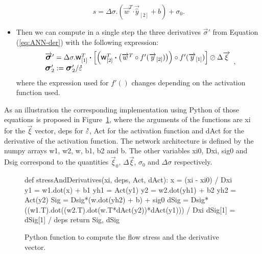 \documentclass[algorithms,article,submit,pdftex,oneauthors]{Definitions/mdpi}
\DeclareRobustCommand{\w}{\mbox{\large\ensuremath{\mathsf{w}}}}
\DeclareRobustCommand{\dotp}{\boldsymbol{\cdot}}
\DeclareRobustCommand{\lay}[1]{_{[#1]}}
\DeclareRobustCommand{\mdot}[1]{\accentset{\mbox{\bfseries .}}{#1}}
\DeclareRobustCommand{\Sig}{\mbox{\large\ensuremath{\boldsymbol{\sigma}}}}
\DeclareRobustCommand{\var}[1]{\textsf{#1}}
\begin{document}
\begin{itemize}
\begin{equation}
s = \Delta\sigma.\left(\overrightarrow{w}^T \dotp \overrightarrow{\hat{y}}\lay{2} + b\right) + \sigma_{0}.
\end{equation}
\item Then we can compute in a single step the three derivatives $\overrightarrow{\sigma}'$ from Equation (\ref{eq:ANN-der}) with the following expression:
\begin{equation}
\begin{array}{l}
\overrightarrow{\Sig}' = \Delta\sigma.\w\lay{1}^T \dotp\left[\left(\w\lay{2}^T \dotp \left(\overrightarrow{w}^T \circ f'(\overrightarrow{y}\lay{2})\right)\right) \circ f'(\overrightarrow{y}\lay{1})\right] \oslash \Delta\overrightarrow{\xi}\\
\Sig_2' := \Sig_2' / \mdot{\varepsilon}
\end{array},
\end{equation}
where the expression used for $f'()$ changes depending on the activation function used.
\end{itemize}
As an illustration the corresponding implementation using Python of those equations is proposed in Figure~\ref{fig:PythonStress}, where the arguments of the functions are \var{xi} for the $\overrightarrow{\xi}$ vector, \var{deps} for $\mdot{\varepsilon}$, \var{Act} for the activation function and \var{dAct} for the derivative of the activation function.
The network architecture is defined by the numpy arrays \var{w1}, \var{w2}, \var{w}, \var{b1}, \var{b2} and \var{b}.
The other variables \var{xi0}, \var{Dxi}, \var{sig0} and \var{Dsig} correspond to the quantities $\overrightarrow{\xi}_{0}$, $\Delta\overrightarrow{\xi}$, $\sigma_{0}$ and $\Delta\sigma$ respectively.
\begin{figure}[h]
\begin{PythonListing}
def stressAndDerivatives(xi, deps, Act, dAct):
  x = (xi - xi0) / Dxi
  y1 = w1.dot(x) + b1
  yh1 = Act(y1)
  y2 = w2.dot(yh1) + b2
  yh2 = Act(y2)
  Sig = Dsig*(w.dot(yh2) + b) + sig0
  dSig = Dsig*((w1.T).dot((w2.T).dot(w.T*dAct(y2))*dAct(y1))) / Dxi
  dSig[1] = dSig[1] / deps
  return Sig, dSig
\end{PythonListing}
\caption{Python function to compute the flow stress and the derivative vector.\label{fig:PythonStress}}
\end{figure}
\end{document}
